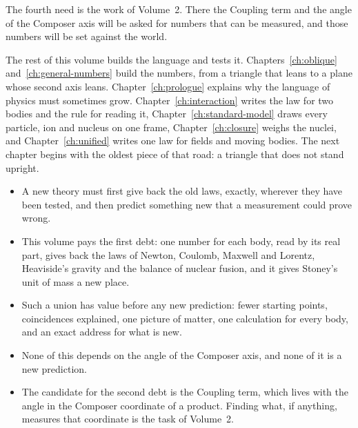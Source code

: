 The fourth need is the work of Volume~2. There the Coupling term and the angle of the Composer axis will be asked for numbers that can be measured, and those numbers will be set against the world.

The rest of this volume builds the language and tests it. Chapters~\ref{ch:oblique} and~\ref{ch:general-numbers} build the numbers, from a triangle that leans to a plane whose second axis leans. Chapter~\ref{ch:prologue} explains why the language of physics must sometimes grow. Chapter~\ref{ch:interaction} writes the law for two bodies and the rule for reading it, Chapter~\ref{ch:standard-model} draws every particle, ion and nucleus on one frame, Chapter~\ref{ch:closure} weighs the nuclei, and Chapter~\ref{ch:unified} writes one law for fields and moving bodies. The next chapter begins with the oldest piece of that road: a triangle that does not stand upright.

\begin{plainwords}
\begin{itemize}
  \item A new theory must first give back the old laws, exactly, wherever they have been tested, and then predict something new that a measurement could prove wrong.
  \item This volume pays the first debt: one number for each body, read by its real part, gives back the laws of Newton, Coulomb, Maxwell and Lorentz, Heaviside's gravity and the balance of nuclear fusion, and it gives Stoney's unit of mass a new place.
  \item Such a union has value before any new prediction: fewer starting points, coincidences explained, one picture of matter, one calculation for every body, and an exact address for what is new.
  \item None of this depends on the angle of the Composer axis, and none of it is a new prediction.
  \item The candidate for the second debt is the Coupling term, which lives with the angle in the Composer coordinate of a product. Finding what, if anything, measures that coordinate is the task of Volume~2.
\end{itemize}
\end{plainwords}
